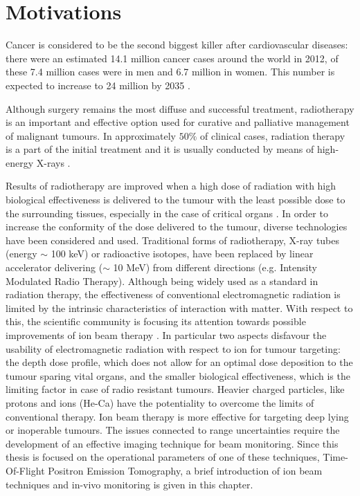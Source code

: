 \chapter{Motivations}

Cancer is considered to be the second biggest killer after cardiovascular diseases: there were an estimated 14.1 million cancer cases around the world in 2012, of these 7.4 million cases were in men and 6.7 million in women. This number is expected to increase to 24 million by 2035 \cite{Ferlay2012}.

Although surgery remains the most diffuse and successful treatment, radiotherapy is an important and effective option used for curative and palliative management of malignant tumours.
In approximately $50\%$ of clinical cases, radiation therapy is a part of the initial treatment and it is usually conducted by means of high-energy X-rays \cite{Durante2010}.

Results of radiotherapy are improved when a high dose of radiation with high biological effectiveness is delivered to the tumour with the least possible dose to the surrounding tissues, especially in the case of critical organs \cite{Linz2011}.
In order to increase the conformity of the dose delivered to the tumour, diverse technologies have been considered and used.
Traditional forms of radiotherapy, X-ray tubes (energy $\sim$ 100 keV) or radioactive isotopes, have been replaced by linear accelerator delivering ($\sim$ 10 MeV) from different directions (e.g. Intensity Modulated Radio Therapy).
Although being widely used as a standard in radiation therapy, the effectiveness of conventional electromagnetic radiation is limited by the intrinsic characteristics of interaction with matter.
With respect to this, the scientific community is focusing its attention towards possible improvements of ion beam therapy \cite{Amaldi2011}.
In particular two aspects disfavour the usability of electromagnetic radiation with respect to ion for tumour targeting: the depth dose profile, which does not allow for an optimal dose deposition to the tumour sparing vital organs,
and the smaller biological effectiveness, which is the limiting factor in case of radio resistant tumours.
Heavier charged particles, like protons and ions (He-Ca) have the potentiality to overcome the limits of conventional therapy. 
Ion beam therapy is more effective for targeting deep lying or inoperable tumours.
The issues connected to range uncertainties require the development of an effective imaging technique for beam monitoring. 
Since this thesis is focused on the operational parameters of one of these techniques, Time-Of-Flight Positron Emission Tomography, a brief introduction of ion beam techniques and in-vivo monitoring is given in this chapter.

